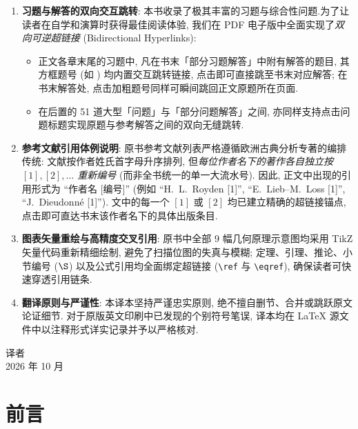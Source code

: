 \begin{enumerate}[label=\arabic*., leftmargin=2.2em, itemsep=0.15em, topsep=0.15em]
	\item \textbf{习题与解答的双向交互跳转}:
	      本书收录了极其丰富的习题与综合性问题.为了让读者在自学和演算时获得最佳阅读体验,
	      我们在 PDF 电子版中全面实现了\emph{双向可逆超链接} (Bidirectional Hyperlinks):
	      \begin{itemize}[label=$\circ$, leftmargin=1.5em, itemsep=0.05em, topsep=0.05em]
		      \item 正文各章末尾的习题中, 凡在书末「部分习题解答」中附有解答的题目,
		            其方框题号 (如 ) 均内置交互跳转链接, 点击即可直接跳至书末对应解答;
		            在书末解答处, 点击加粗题号同样可瞬间跳回正文原题所在页面.
		      \item 在后置的 51 道大型「问题」与「部分问题解答」之间,
		            亦同样支持点击问题标题实现原题与参考解答之间的双向无缝跳转.
	      \end{itemize}
	\item \textbf{参考文献引用体例说明}:
	      原书参考文献列表严格遵循欧洲古典分析专著的编排传统:
	      文献按作者姓氏首字母升序排列, 但\emph{每位作者名下的著作各自独立按 $[1],[2],\dots$ 重新编号} (而非全书统一的单一大流水号).
	      因此, 正文中出现的引用形式为 ``作者名 [编号]'' (例如 ``H.~L.~Royden [1]'', ``E.~Lieb--M.~Loss [1]'', ``J.~Dieudonné [1]'').
	      文中的每一个 $[1]$ 或 $[2]$ 均已建立精确的超链接锚点, 点击即可直达书末该作者名下的具体出版条目.
	\item \textbf{图表矢量重绘与高精度交叉引用}:
	      原书中全部 9 幅几何原理示意图均采用 TikZ 矢量代码重新精细绘制, 避免了扫描位图的失真与模糊;
	      定理、引理、推论、小节编号 ($\S$) 以及公式引用均全面绑定超链接 (\verb|\ref| 与 \verb|\eqref|),
	      确保读者可快速穿透引用链条.
	\item \textbf{翻译原则与严谨性}:
	      本译本坚持严谨忠实原则, 绝不擅自删节、合并或跳跃原文论证细节.
	      对于原版英文印刷中已发现的个别符号笔误, 译本均在 LaTeX 源文件中以注释形式详实记录并予以严格核对.
\end{enumerate}

\vspace{0.6\baselineskip}
\begin{flushright}
	译者\\
	2026 年 10 月
\end{flushright}

\cleardoublepage

\chapter*{前言}

